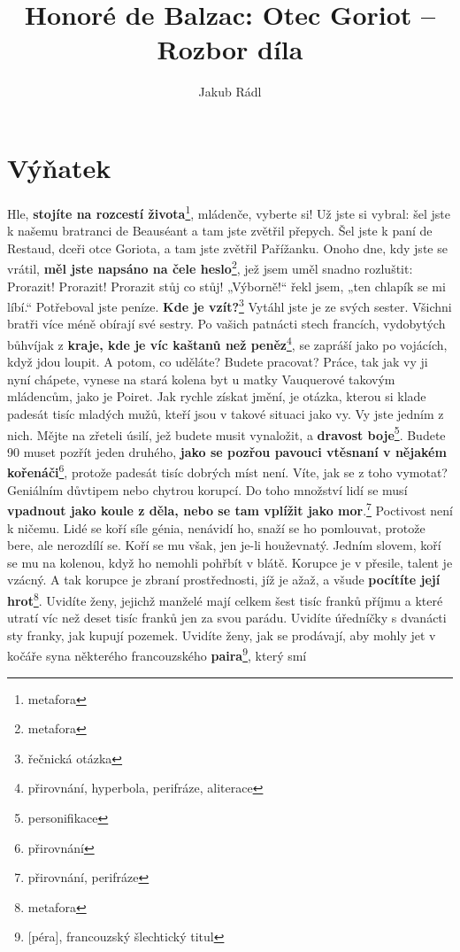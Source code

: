 \documentclass[10pt,a4paper]{article}
\date{}
\author{Jakub Rádl}
\title{Honoré de Balzac: Otec Goriot -- Rozbor díla}
\begin{document}
\maketitle

\section*{Výňatek}
Hle, \textbf{stojíte na rozcestí života}\footnote{metafora}, mládenče,
vyberte si! Už jste si vybral: šel jste k našemu bratranci de
Beauséant a tam jste zvětřil přepych. Šel jste k paní de Restaud,
dceři otce Goriota, a tam jste zvětřil Pařížanku. Onoho dne, kdy
jste se vrátil, \textbf{měl jste napsáno na čele heslo}\footnote{metafora}, jež jsem uměl snadno
rozluštit: Prorazit! Prorazit! Prorazit stůj co stůj! „Výborně!“ řekl
jsem, „ten chlapík se mi líbí.“ Potřeboval jste peníze. \textbf{Kde je vzít?}\footnote{řečnická otázka}
Vytáhl jste je ze svých sester. Všichni bratři více méně obírají své
sestry. Po vašich patnácti stech francích, vydobytých bůhvíjak z
\textbf{kraje, kde je víc kaštanů než peněz}\footnote{přirovnání, hyperbola, perifráze, aliterace}, se zapráší jako po vojácích,
když jdou loupit. A potom, co uděláte? Budete pracovat? Práce,
tak jak vy ji nyní chápete, vynese na stará kolena byt u matky
Vauquerové takovým mládencům, jako je Poiret. Jak rychle získat
jmění, je otázka, kterou si klade padesát tisíc mladých mužů, kteří
jsou v takové situaci jako vy. Vy jste jedním z nich. Mějte na
zřeteli úsilí, jež budete musit vynaložit, a \textbf{dravost boje}\footnote{personifikace}. Budete 
90
muset pozřít jeden druhého, \textbf{jako se pozřou pavouci vtěsnaní v
nějakém kořenáči}\footnote{přirovnání}, protože padesát tisíc dobrých míst není. Víte,
jak se z toho vymotat? Geniálním důvtipem nebo chytrou korupcí.
Do toho množství lidí se musí \textbf{vpadnout jako koule z děla, nebo se
tam vplížit jako mor}.\footnote{přirovnání, perifráze} Poctivost není k ničemu. Lidé se koří síle
génia, nenávidí ho, snaží se ho pomlouvat, protože bere, ale
nerozdílí se. Koří se mu však, jen je-li houževnatý. Jedním slovem,
koří se mu na kolenou, když ho nemohli pohřbít v blátě. Korupce
je v přesile, talent je vzácný. A tak korupce je zbraní prostřednosti,
jíž je ažaž, a všude \textbf{pocítíte její hrot}\footnote{metafora}. Uvidíte ženy, jejichž manželé
mají celkem šest tisíc franků příjmu a které utratí víc než deset
tisíc franků jen za svou parádu. Uvidíte úředníčky s dvanácti sty
franky, jak kupují pozemek. Uvidíte ženy, jak se prodávají, aby
mohly jet v kočáře syna některého francouzského \textbf{paira}\footnote{[péra], francouzský šlechtický titul}, který smí
\end{document}
